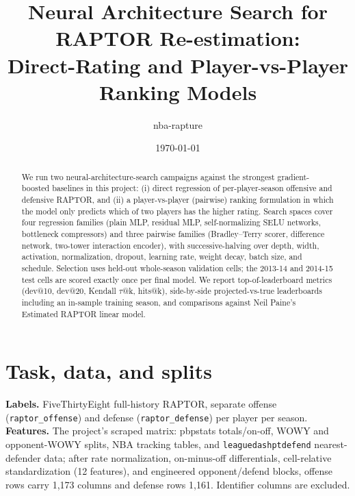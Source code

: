\documentclass[10pt]{article}
\title{Neural Architecture Search for RAPTOR Re-estimation:\\
Direct-Rating and Player-vs-Player Ranking Models}
\author{nba-rapture}
\date{\today}
\begin{document}
\maketitle

\begin{abstract}
We run two neural-architecture-search campaigns against the strongest
gradient-boosted baselines in this project: (i) direct regression of
per-player-season offensive and defensive RAPTOR, and (ii) a player-vs-player
(pairwise) ranking formulation in which the model only predicts which of two
players has the higher rating. Search spaces cover four regression families
(plain MLP, residual MLP, self-normalizing SELU networks, bottleneck
compressors) and three pairwise families (Bradley--Terry scorer, difference
network, two-tower interaction encoder), with successive-halving over
depth, width, activation, normalization, dropout, learning rate, weight decay,
batch size, and schedule. Selection uses held-out whole-season validation
cells; the 2013-14 and 2014-15 test cells are scored exactly once per final
model. We report top-of-leaderboard metrics (dev@10, dev@20, Kendall
$\tau$@k, hits@k), side-by-side projected-vs-true leaderboards including an
in-sample training season, and comparisons against Neil Paine's Estimated
RAPTOR linear model.
\end{abstract}

\section{Task, data, and splits}
\textbf{Labels.} FiveThirtyEight full-history RAPTOR, separate offense
(\texttt{raptor\_offense}) and defense (\texttt{raptor\_defense}) per player
per season. \textbf{Features.} The project's scraped matrix: pbpstats
totals/on-off, WOWY and opponent-WOWY splits, NBA tracking tables, and
\texttt{leaguedashptdefend} nearest-defender data; after rate normalization,
on-minus-off differentials, cell-relative standardization (12 features), and
engineered opponent/defend blocks, offense rows carry 1{,}173 columns and
defense rows 1{,}161. Identifier columns are excluded.
\end{document}
